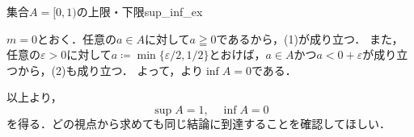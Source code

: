 \begin{example}{集合$A=[0,1)$の上限・下限}{sup_inf_ex}
\begin{description}
      $m = 0$とおく．任意の$a \in A$に対して$a \geqq 0$であるから，(1)が成り立つ．
      また，任意の$\varepsilon > 0$に対して$a \coloneqq \min\{\varepsilon/2,1/2\}$とおけば，$a \in A$かつ$a < 0 + \varepsilon$が成り立つから，(2)も成り立つ．
      よって，より$\inf A = 0$である．
  \end{description}

  以上より，
  \[
    \sup A = 1, \quad \inf A = 0
  \]
  を得る．どの視点から求めても同じ結論に到達することを確認してほしい．
\end{example}
